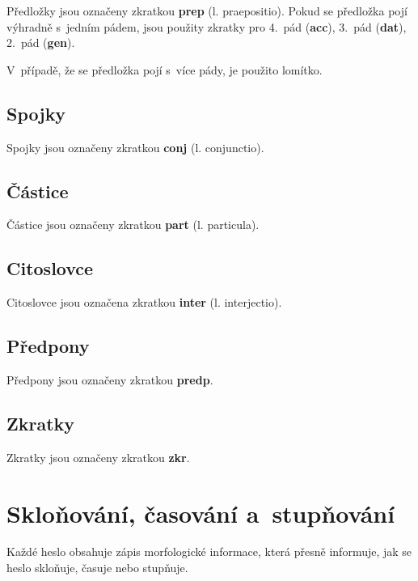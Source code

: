 Předložky jsou označeny zkratkou \textbf{prep} (l. praepositio). Pokud se předložka pojí výhradně s~jedním pádem, jsou použity zkratky pro 4.~pád (\textbf{acc}), 3.~pád (\textbf{dat}), 2.~pád (\textbf{gen}).

\blspace
  \dicEntry {}  
\blspace

V~případě, že se předložka pojí s~více pády, je použito lomítko.

\blspace
  \dicEntry {}  
\blspace

\subsection*{Spojky}

Spojky jsou označeny zkratkou \textbf{conj} (l. conjunctio).

\subsection*{Částice}

Částice jsou označeny zkratkou \textbf{part} (l. particula).

\subsection*{Citoslovce}

Citoslovce jsou označena zkratkou \textbf{inter} (l. interjectio).

\subsection*{Předpony}

Předpony jsou označeny zkratkou \textbf{predp}.

\subsection*{Zkratky}

Zkratky jsou označeny zkratkou \textbf{zkr}.

\section{Skloňování, časování a~stupňování}

Každé heslo obsahuje zápis morfologické informace, která přesně informuje, jak se heslo skloňuje, časuje nebo stupňuje.


